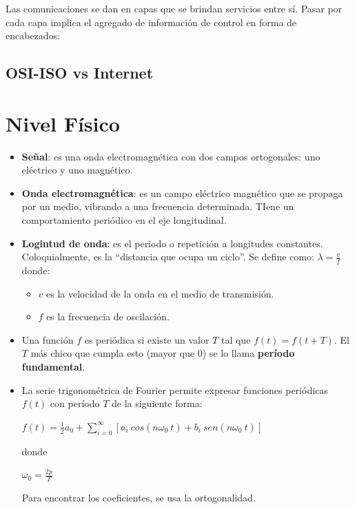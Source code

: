 \documentclass[]{article}
\begin{document}
Las comunicaciones se dan en capas que se brindan servicios entre sí. Pasar por cada capa implica el agregado de información de control en forma de encabezados:


\subsection{OSI-ISO vs Internet}


\section{Nivel Físico}
\begin{itemize}
    \item \textbf{Señal}: es una onda electromagnética con dos campos ortogonales: uno eléctrico y uno magnético.
    \item \textbf{Onda electromagnética}: es un campo eléctrico magnético que se propaga por un medio, vibrando a una frecuencia determinada. TIene un comportamiento periódico en el eje longitudinal.
    \item \textbf{Logintud de onda}: es el periodo o repetición a longitudes constantes. Coloquialmente, es la ``distancia que ocupa un ciclo''. Se define como: $\displaystyle \lambda = \frac{v}{f}$ donde:
    \begin{itemize}
        \item $v$ es la velocidad de la onda en el medio de transmisión.
        \item $f$ es la frecuencia de oscilación.
    \end{itemize}
    \item Una función $f$ es periódica si existe un valor $T$ tal que $f(t) = f(t + T)$. El $T$ más chico que cumpla esto (mayor que 0) se lo llama \textbf{período fundamental}.
    \item La serie trigonométrica de Fourier permite expresar funciones periódicas $f(t)$ con período $T$ de la siguiente forma:
    \begin{center}
        $f(t) = \displaystyle \frac{1}{2}a_0 + \sum_{i=0}^{\infty}[a_i\ cos(n\omega_0\ t) + b_i\ sen(n\omega_0\ t)]$
    \end{center}
    donde
    \begin{center}
        $\omega_0 = \displaystyle \frac{2p}{T}$
    \end{center}

    Para encontrar los coeficientes, se usa la ortogonalidad.
\end{itemize}
\end{document}
